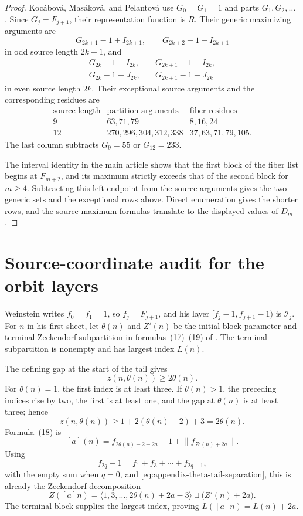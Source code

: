 \begin{proof}
Koc\'abov\'a, Mas\'akov\'a, and Pelantov\'a use \(G_0=G_1=1\) and parts
\(G_1,G_2,\ldots\) \cite{KocabovaMasakovaPelantova2005}.  Since
\(G_j=F_{j+1}\), their representation function is \(R\).  Their generic
maximizing arguments are
\[
 G_{2k+1}-1+I_{2k+1},\qquad G_{2k+2}-1-I_{2k+1}
\]
in odd source length \(2k+1\), and
\[
 \begin{split}
 G_{2k}-1+I_{2k},&\quad G_{2k+1}-1-I_{2k},\\
 G_{2k}-1+J_{2k},&\quad G_{2k+1}-1-J_{2k}
 \end{split}
\]
in even source length \(2k\).  Their exceptional source arguments and the
corresponding residues are
\[
\begin{array}{c|c|c}
\text{source length}&\text{partition arguments}&\text{fiber residues}\\ \hline
9&63,71,79&8,16,24\\
12&270,296,304,312,338&37,63,71,79,105.
\end{array}
\]
The last column subtracts \(G_9=55\) or \(G_{12}=233\).

The interval identity in the main article shows that the first block of the
fiber list begins at \(F_{m+2}\), and its maximum strictly exceeds that of
the second block for \(m\ge4\).  Subtracting this left endpoint from the
source arguments gives the two generic sets and the exceptional rows above.
Direct enumeration gives the shorter rows, and the source maximum formulas
translate to the displayed values of \(D_m\).
\end{proof}

\section{Source-coordinate audit for the orbit layers}

Weinstein writes \(f_0=f_1=1\), so \(f_j=F_{j+1}\), and his layer
\([f_j-1,f_{j+1}-1)\) is \(\mathcal I_j\).  For \(n\) in his first sheet,
let \(\theta(n)\) and \(Z'(n)\) be the initial-block parameter and terminal
Zeckendorf subpartition in formulas~(17)--(19) of
\cite{Weinstein2016}.  The terminal subpartition is nonempty and has largest
index \(L(n)\).

The defining gap at the start of the tail gives
\begin{equation}
 z(n,\theta(n))\ge2\theta(n).
 \label{eq:appendix-theta-tail-separation}
\end{equation}
For \(\theta(n)=1\), the first index is at least three.  If
\(\theta(n)>1\), the preceding indices rise by two, the first is at least
one, and the gap at \(\theta(n)\) is at least three; hence
\[
 z(n,\theta(n))\ge1+2(\theta(n)-2)+3=2\theta(n).
\]
Formula~(18) is
\[
 [a](n)=f_{2\theta(n)-2+2a}-1
       +\lVert f_{Z'(n)+2a}\rVert.
\]
Using
\[
 f_{2q}-1=f_1+f_3+\cdots+f_{2q-1},
\]
with the empty sum when \(q=0\), and
\eqref{eq:appendix-theta-tail-separation}, this is already the Zeckendorf
decomposition
\[
 Z([a]n)=\langle1,3,\ldots,2\theta(n)+2a-3\rangle
 \sqcup\bigl(Z'(n)+2a\bigr).
\]
The terminal block supplies the largest index, proving
\(L([a]n)=L(n)+2a\).

